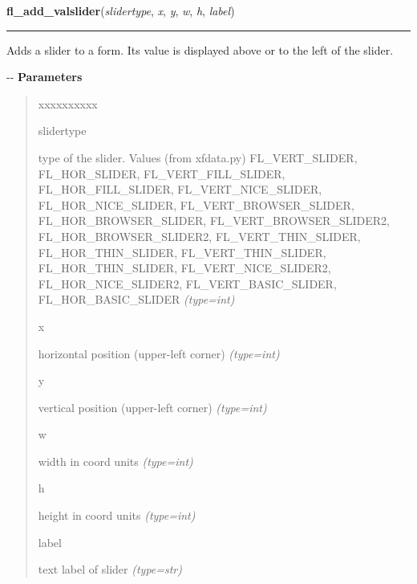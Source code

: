 \hspace{.8\funcindent}\begin{boxedminipage}{\funcwidth}

    \raggedright \textbf{fl\_add\_valslider}(\textit{slidertype}, \textit{x}, \textit{y}, \textit{w}, \textit{h}, \textit{label})

    \vspace{-1.5ex}

    \rule{\textwidth}{0.5\fboxrule}
\setlength{\parskip}{2ex}

Adds a slider to a form. Its value is displayed above or to the left
of the slider.

-{}-
\setlength{\parskip}{1ex}
      \textbf{Parameters}
      \vspace{-1ex}

      \begin{quote}
        \begin{Ventry}{xxxxxxxxxx}

          \item[slidertype]


type of the slider. Values (from xfdata.py) FL\_VERT\_SLIDER,
FL\_HOR\_SLIDER, FL\_VERT\_FILL\_SLIDER, FL\_HOR\_FILL\_SLIDER,
FL\_VERT\_NICE\_SLIDER, FL\_HOR\_NICE\_SLIDER, FL\_VERT\_BROWSER\_SLIDER,
FL\_HOR\_BROWSER\_SLIDER, FL\_VERT\_BROWSER\_SLIDER2, FL\_HOR\_BROWSER\_SLIDER2,
FL\_VERT\_THIN\_SLIDER, FL\_HOR\_THIN\_SLIDER, FL\_VERT\_THIN\_SLIDER,
FL\_HOR\_THIN\_SLIDER, FL\_VERT\_NICE\_SLIDER2, FL\_HOR\_NICE\_SLIDER2,
FL\_VERT\_BASIC\_SLIDER, FL\_HOR\_BASIC\_SLIDER
            {\it (type=int)}

          \item[x]


horizontal position (upper-left corner)
            {\it (type=int)}

          \item[y]


vertical position (upper-left corner)
            {\it (type=int)}

          \item[w]


width in coord units
            {\it (type=int)}

          \item[h]


height in coord units
            {\it (type=int)}

          \item[label]


text label of slider
            {\it (type=str)}


\end{Ventry}
\end{quote}
\end{boxedminipage}
